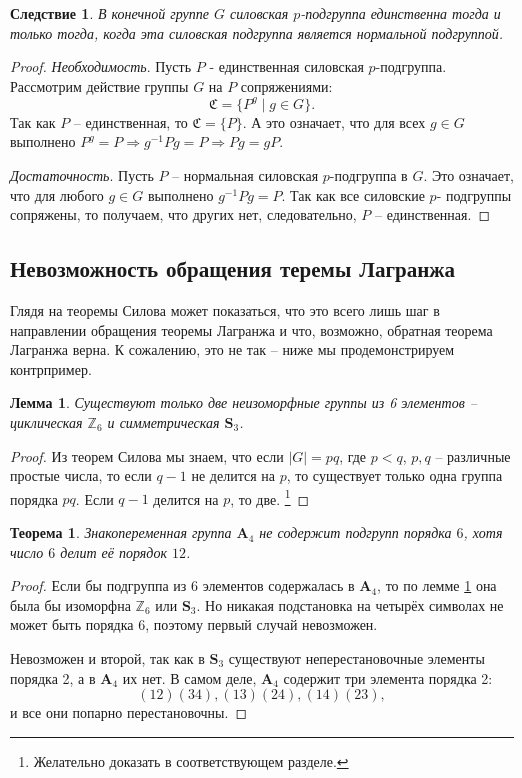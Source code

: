 \documentclass{article}
\newtheorem{corollary}{Следствие}[section]
\newtheorem{lemma}{Лемма}[section]
\newtheorem{theorem}{Теорема}[section]
\begin{document}
\begin{corollary}
    В конечной группе $G$ силовская $p$-подгруппа единственна тогда и только тогда, когда эта силовская подгруппа является нормальной подгруппой.
\end{corollary}
\begin{proof}
    \textit{Необходимость}. Пусть $P$ - единственная силовская $p$-подгруппа. Рассмотрим действие группы $G$ на $P$ сопряжениями: $$ \mathfrak{C} = \{ P^g \mid g \in G \}. $$ Так как $P$ -- единственная, то $\mathfrak{C} = \{ P \}$. А это означает, что для всех $g \in G$ выполнено $P^g = P \Rightarrow g^{-1} P g = P \Rightarrow Pg = gP$.

    \textit{Достаточность}. Пусть $P$ -- нормальная силовская $p$-подгруппа в $G$. Это означает, что для любого $g \in G$ выполнено $g^{-1}P g = P$. Так как все силовские $p$- подгруппы сопряжены, то получаем, что других нет, следовательно, $P$ -- единственная.
\end{proof}

\subsection{Невозможность обращения теремы Лагранжа}

Глядя на теоремы Силова может показаться, что это всего лишь шаг в направлении обращения теоремы Лагранжа и что, возможно, обратная теорема Лагранжа верна. К сожалению, это не так -- ниже мы продемонстрируем контрпример.

\begin{lemma} \label{Katana}
    Существуют только две неизоморфные группы из 6 элементов -- циклическая $\mathbb{Z}_6$ и симметрическая $\mathbf{S}_3$.
\end{lemma}
\begin{proof}
    Из теорем Силова мы знаем, что если $|G| = pq$, где $p < q$, $p,q$ -- различные простые числа, то если $q - 1$ не делится на $p$, то существует только одна группа порядка $pq$. Если $q - 1$ делится на $p$, то две. \footnote{Желательно доказать в соответствующем разделе.}
\end{proof}

\begin{theorem}
    Знакопеременная группа $\mathbf{A}_4$ не содержит подгрупп порядка $6$, хотя число $6$ делит её порядок $12$.
\end{theorem}
\begin{proof}
    Если бы подгруппа из $6$ элементов содержалась в $\mathbf{A}_4$, то по лемме \ref{Katana} она была бы изоморфна $\mathbb{Z}_6$ или $\mathbf{S}_3$. Но никакая подстановка на четырёх символах не может быть порядка 6, поэтому первый случай невозможен.

    Невозможен и второй, так как в $\mathbf{S}_3$ существуют неперестановочные элементы порядка 2, а в $\mathbf{A}_4$ их нет. В самом деле, $\mathbf{A}_4$ содержит три элемента порядка 2: $$ (12)(34), (13)(24), (14)(23), $$ и все они попарно перестановочны.
\end{proof}
\end{document}
